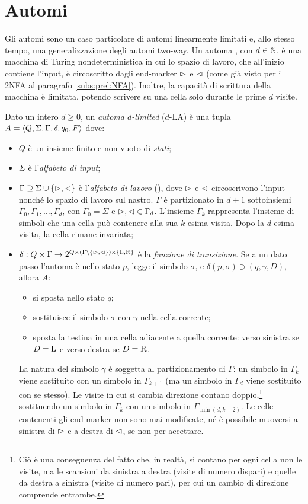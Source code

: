 \section{Automi }
Gli automi  sono un caso particolare di automi linearmente limitati e, allo stesso tempo, una generalizzazione degli automi two-way. Un automa , con $d\in\mathbb N$, è una macchina di Turing nondeterministica in cui lo spazio di lavoro, che all'inizio contiene l'input, è circoscritto dagli end-marker $\rhd$ e $\lhd$ (come già visto per i 2NFA al paragrafo \ref{subs:prel:NFA}). Inoltre, la capacità di scrittura della macchina è limitata, potendo scrivere su una cella solo durante le prime $d$ visite.
\begin{defin}
	Dato un intero $d\geq 0$, un \emph{automa $d$-limited} ($d$-LA) è una tupla $A=\langle Q,\Sigma,\Gamma,\delta,q_0,F \rangle$ dove:
	\begin{itemize}
		\item $Q$ è un insieme finito e non vuoto di \emph{stati};
		\item $\Sigma$ è l'\emph{alfabeto di input};
		\item $\Gamma\supseteq\Sigma\cup\left\{ \rhd,\lhd \right\}$ è l'\emph{alfabeto di lavoro} (), dove $\rhd$ e $\lhd$ circoscrivono l'input nonché lo spazio di lavoro sul nastro. $\Gamma$ è partizionato in $d+1$ sottoinsiemi $\Gamma_0,\Gamma_1,\dots,\Gamma_d$, con $\Gamma_0=\Sigma$ e $\rhd,\lhd\in\Gamma_d$. L'insieme $\Gamma_k$ rappresenta l'insieme di simboli che una cella può contenere alla sua $k$-esima visita. Dopo la $d$-esima visita, la cella rimane invariata;
		\item $\delta:Q\times\Gamma\to 2^{Q\times(\Gamma\setminus\left\{ \rhd,\lhd \right\})\times\left\{ \mathrm L,\mathrm R \right\}}$ è la \emph{funzione di transizione}. Se a un dato passo l'automa è nello stato $p$, legge il simbolo $\sigma$, e $\delta(p,\sigma)\ni (q,\gamma,D)$, allora $A$:
		      \begin{itemize}
			      \item si sposta nello stato $q$;
			      \item sostituisce il simbolo $\sigma$ con $\gamma$ nella cella corrente;
			      \item sposta la testina in una cella adiacente a quella corrente: verso sinistra se $D=\mathrm L$ e verso destra se $D=\mathrm R$.
		      \end{itemize}
		      La natura del simbolo $\gamma$ è soggetta al partizionamento di $\Gamma$: un simbolo in $\Gamma_k$ viene sostituito con un simbolo in $\Gamma_{k+1}$ (ma un simbolo in $\Gamma_d$ viene sostituito con se stesso). Le visite in cui si cambia direzione contano doppio,\footnote{Ciò è una conseguenza del fatto che, in realtà, si contano per ogni cella non le visite, ma le scansioni da sinistra a destra (visite di numero dispari) e quelle da destra a sinistra (visite di numero pari), per cui un cambio di direzione comprende entrambe.} sostituendo un simbolo in $\Gamma_k$ con un simbolo in $\Gamma_{\min(d,k+2)}$. Le celle contenenti gli end-marker non sono mai modificate, né è possibile muoversi a sinistra di $\rhd$ e a destra di $\lhd$, se non per accettare.

\end{itemize}
\end{defin}
